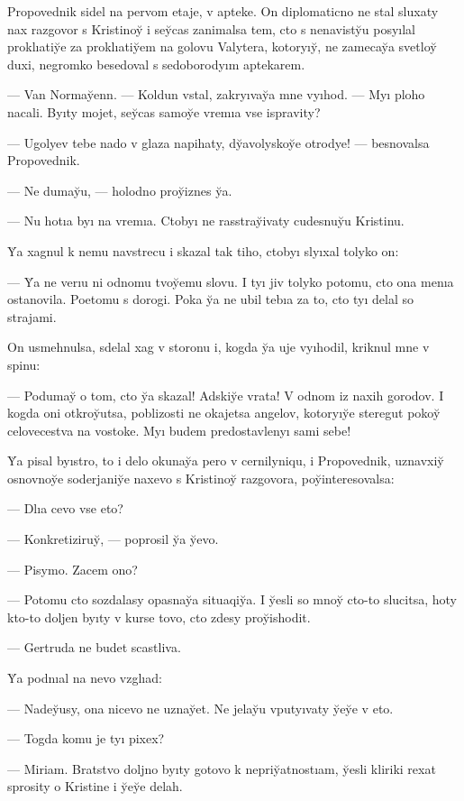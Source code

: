 \documentclass[10pt]{book}
\begin{document}
Propovednik sidel na pervom etaje, v apteke. On diplomaticno ne stal sluxaty nax razgovor s Kristinoy̆ i sey̆cas zanimalsa tem, cto s nenavisty̆u posyılal proklıatiy̆e za proklıatiy̆em na golovu Valytera, kotoryıy̆, ne zamecay̆a svetloy̆ duxi, negromko besedoval s sedoborodyım aptekarem.

— Van Normay̆enn. — Koldun vstal, zakryıvay̆a mne vyıhod. — Myı ploho nacali. Byıty mojet, sey̆cas samoy̆e vremıa vse ispravity?

— Ugolyev tebe nado v glaza napihaty, dy̆avolyskoy̆e otrodye! — besnovalsa Propovednik.

— Ne dumay̆u, — holodno proy̆iznes y̆a.

— Nu hotıa byı na vremıa. Ctobyı ne rasstray̆ivaty cudesnuy̆u Kristinu.

Y̆a xagnul k nemu navstrecu i skazal tak tiho, ctobyı slyıxal tolyko on:

— Y̆a ne verıu ni odnomu tvoy̆emu slovu. I tyı jiv tolyko potomu, cto ona menıa ostanovila. Poetomu s dorogi. Poka y̆a ne ubil tebıa za to, cto tyı delal so strajami.

On usmehnulsa, sdelal xag v storonu i, kogda y̆a uje vyıhodil, kriknul mne v spinu:

— Podumay̆ o tom, cto y̆a skazal! Adskiy̆e vrata! V odnom iz naxih gorodov. I kogda oni otkroy̆utsa, poblizosti ne okajetsa angelov, kotoryıy̆e steregut pokoy̆ celovecestva na vostoke. Myı budem predostavlenyı sami sebe!



Y̆a pisal byıstro, to i delo okunay̆a pero v cernilyniqu, i Propovednik, uznavxiy̆ osnovnoy̆e soderjaniy̆e naxevo s Kristinoy̆ razgovora, poy̆interesovalsa:

— Dlıa cevo vse eto?

— Konkretiziruy̆, — poprosil y̆a y̆evo.

— Pisymo. Zacem ono?

— Potomu cto sozdalasy opasnay̆a situaqiy̆a. I y̆esli so mnoy̆ cto-to slucitsa, hoty kto-to doljen byıty v kurse tovo, cto zdesy proy̆ishodit.

— Gertruda ne budet scastliva.

Y̆a podnıal na nevo vzglıad:

— Nadey̆usy, ona nicevo ne uznay̆et. Ne jelay̆u vputyıvaty y̆ey̆e v eto.

— Togda komu je tyı pixex?

— Miriam. Bratstvo doljno byıty gotovo k nepriy̆atnostıam, y̆esli kliriki rexat sprosity o Kristine i y̆ey̆e delah.
\end{document}
